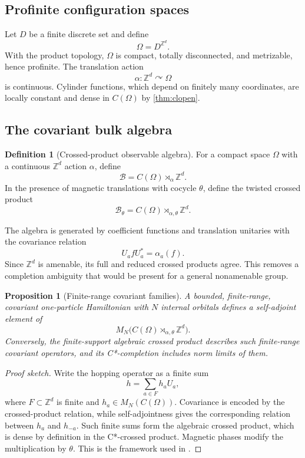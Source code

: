 \documentclass[12pt]{article}
\newtheorem{proposition}[theorem]{Proposition}
\theoremstyle{definition}
\newtheorem{definition}[theorem]{Definition}
\theoremstyle{remark}
\newcommand{\Z}{\mathbb Z}
\newcommand{\B}{\mathcal B}
\begin{document}
\subsection{Profinite configuration spaces}

Let $D$ be a finite discrete set and define
\[
\Omega=D^{\Z^d}.
\]
With the product topology, $\Omega$ is compact, totally disconnected, and metrizable,
hence profinite.  The translation action
\[
\alpha:\Z^d\curvearrowright\Omega
\]
is continuous.  Cylinder functions, which depend on finitely many coordinates, are
locally constant and dense in $C(\Omega)$ by \cref{thm:clopen}.

\subsection{The covariant bulk algebra}

\begin{definition}[Crossed-product observable algebra]
For a compact space $\Omega$ with a continuous $\Z^d$ action $\alpha$, define
\[
\B=C(\Omega)\rtimes_\alpha\Z^d.
\]
In the presence of magnetic translations with cocycle $\theta$, define the twisted
crossed product
\[
\B_\theta=C(\Omega)\rtimes_{\alpha,\theta}\Z^d.
\]
\end{definition}

The algebra is generated by coefficient functions and translation unitaries with
the covariance relation
\[
U_a f U_a^*=\alpha_a(f).
\]
Since $\Z^d$ is amenable, its full and reduced crossed products agree.  This removes
a completion ambiguity that would be present for a general nonamenable group.

\begin{proposition}[Finite-range covariant families]
A bounded, finite-range, covariant one-particle Hamiltonian with $N$ internal orbitals
defines a self-adjoint element of
\[
M_N\bigl(C(\Omega)\rtimes_{\alpha,\theta}\Z^d\bigr).
\]
Conversely, the finite-support algebraic crossed product describes such finite-range
covariant operators, and its C*-completion includes norm limits of them.
\end{proposition}

\begin{proof}[Proof sketch]
Write the hopping operator as a finite sum
\[
h=\sum_{a\in F}h_aU_a,
\]
where $F\subset\Z^d$ is finite and $h_a\in M_N(C(\Omega))$.  Covariance is encoded by
the crossed-product relation, while self-adjointness gives the corresponding relation
between $h_a$ and $h_{-a}$.  Such finite sums form the algebraic crossed product,
which is dense by definition in the C*-crossed product.  Magnetic phases modify the
multiplication by $\theta$.  This is the framework used in
\cite{Bellissard,BourneKellendonkRennie}.
\end{proof}
\end{document}
